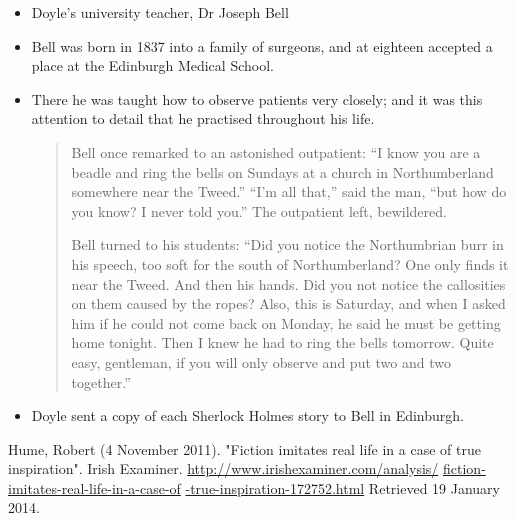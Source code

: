\documentclass[a4paper,landscape,headrule,footrule,xetex,25pt]{foils}
\begin{document}
\begin{itemize}
\item  Doyle's university teacher, Dr Joseph Bell
\item Bell was born in 1837 into a family of surgeons, and at eighteen accepted a place at the Edinburgh Medical School.
\item There he was taught how to observe patients very closely; and it was this attention to detail that he practised throughout his life.
  \begin{quotation}
    
Bell once remarked to an astonished outpatient: “I know you are a beadle and ring the bells on Sundays at a church in Northumberland somewhere near the Tweed.” “I'm all that,” said the man, “but how do you know? I never told you.” The outpatient left, bewildered.

Bell turned to his students: “Did you notice the Northumbrian burr in his speech, too soft for the south of Northumberland? One only finds it near the Tweed. And then his hands. Did you not notice the callosities on them caused by the ropes? Also, this is Saturday, and when I asked him if he could not come back on Monday, he said he must be getting home tonight. Then I knew he had to ring the bells tomorrow. Quite easy, gentleman, if you will only observe and put two and two together.” 
\end{quotation}
\item Doyle sent a copy of each Sherlock Holmes story to Bell in Edinburgh.
\end{itemize}

Hume, Robert (4 November 2011). "Fiction imitates real life in a case of true inspiration". Irish Examiner. 
\url{http://www.irishexaminer.com/analysis/}
\url{fiction-imitates-real-life-in-a-case-of}
\url{-true-inspiration-172752.html} 
Retrieved 19 January 2014.

\end{document}
